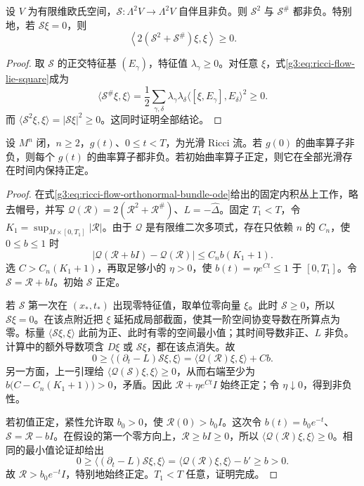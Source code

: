 \begin{lemma}\label{g3:lem:ricci-flow-lie-square-positive}
	设 \(V\) 为有限维欧氏空间，\(\mathcal S:\Lambda^2V\to\Lambda^2V\) 自伴且非负。则 \(\mathcal S^2\) 与 \(\mathcal S^\#\) 都非负。特别地，若 \(\mathcal S\xi=0\)，则
	\[
		\left\langle2(\mathcal S^2+\mathcal S^\#)\xi,\xi\right\rangle\ge0.
	\]
\end{lemma}
\begin{proof}
	取 \(\mathcal S\) 的正交特征基 \((E_\gamma)\)，特征值 \(\lambda_\gamma\ge0\)。对任意 \(\xi\)，式\eqref{g3:eq:ricci-flow-lie-square}成为
	\[
		\langle\mathcal S^\#\xi,\xi\rangle
		=\frac12\sum_{\gamma,\delta}
		\lambda_\gamma\lambda_\delta
		\langle[\xi,E_\gamma],E_\delta\rangle^2\ge0.
	\]
	而 \(\langle\mathcal S^2\xi,\xi\rangle=|\mathcal S\xi|^2\ge0\)。这同时证明全部结论。
\end{proof}

\begin{theorem}\label{g3:thm:ricci-flow-nonnegative-curvature-operator}
	设 \(M^n\) 闭，\(n\ge2\)，\(g(t)\)、\(0\le t<T\)，为光滑 Ricci 流。若 \(g(0)\) 的曲率算子非负，则每个 \(g(t)\) 的曲率算子都非负。若初始曲率算子正定，则它在全部光滑存在时间内保持正定。
\end{theorem}
\begin{proof}
	在式\eqref{g3:eq:ricci-flow-orthonormal-bundle-ode}给出的固定内积丛上工作，略去帽号，并写
	\(\mathcal Q(\mathcal R)=2(\mathcal R^2+\mathcal R^\#)\)、\(L=-\widehat\Delta\)。固定 \(T_1<T\)，令 \(K_1=\sup_{M\times[0,T_1]}|\mathcal R|\)。由于 \(\mathcal Q\) 是有限维二次多项式，存在只依赖 \(n\) 的 \(C_n\)，使 \(0\le b\le1\) 时
	\[
		|\mathcal Q(\mathcal R+bI)-\mathcal Q(\mathcal R)|
		\le C_n b(K_1+1).
	\]
	选 \(C>C_n(K_1+1)\)，再取足够小的 \(\eta>0\)，使 \(b(t)=\eta e^{Ct}\le1\) 于 \([0,T_1]\)。令 \(\mathcal S=\mathcal R+bI\)。初始 \(\mathcal S\) 正定。

	若 \(\mathcal S\) 第一次在 \((x_*,t_*)\) 出现零特征值，取单位零向量 \(\xi\)。此时 \(\mathcal S\ge0\)，所以 \(\mathcal S\xi=0\)。在该点附近把 \(\xi\) 延拓成局部截面，使其一阶空间协变导数在所算点为零。标量 \(\langle\mathcal S\xi,\xi\rangle\) 此前为正、此时有零的空间最小值；其时间导数非正、\(L\) 非负。计算中的额外导数项含 \(D\xi\) 或 \(\mathcal S\xi\)，都在该点消失。故
	\[
		0\ge\langle(\partial_t-L)\mathcal S\xi,\xi\rangle
		=\langle\mathcal Q(\mathcal R)\xi,\xi\rangle+Cb.
	\]
	另一方面，上一引理给 \(\langle\mathcal Q(\mathcal S)\xi,\xi\rangle\ge0\)，从而右端至少为
	\(b\bigl(C-C_n(K_1+1)\bigr)>0\)，矛盾。因此 \(\mathcal R+\eta e^{Ct}I\) 始终正定；令 \(\eta\downarrow0\)，得到非负性。

	若初值正定，紧性允许取 \(b_0>0\)，使 \(\mathcal R(0)>b_0I\)。这次令 \(b(t)=b_0e^{-t}\)、\(\mathcal S=\mathcal R-bI\)。在假设的第一个零方向上，\(\mathcal R\ge bI\ge0\)，所以 \(\langle\mathcal Q(\mathcal R)\xi,\xi\rangle\ge0\)。相同的最小值论证却给出
	\[
		0\ge\langle(\partial_t-L)\mathcal S\xi,\xi\rangle
		=\langle\mathcal Q(\mathcal R)\xi,\xi\rangle-b'
		\ge b>0.
	\]
	故 \(\mathcal R>b_0e^{-t}I\)，特别地始终正定。\(T_1<T\) 任意，证明完成。
\end{proof}

